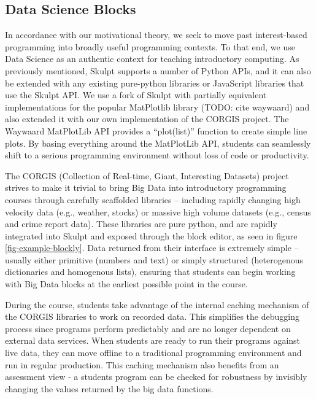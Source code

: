 \documentclass{sig-alternate}
\begin{document}
\subsection{Data Science Blocks}

In accordance with our motivational theory, we seek to move past interest-based programming into broadly useful programming contexts.
To that end, we use Data Science as an authentic context for teaching introductory computing.
As previously mentioned, Skulpt supports a number of Python APIs, and it can also be extended with any existing pure-python libraries or JavaScript libraries that use the Skulpt API.
We use a fork of Skulpt with partially equivalent implementations for the popular MatPlotlib library (TODO: cite waywaard) and also extended it with our own implementation of the CORGIS project.
The Waywaard MatPlotLib API provides a ``plot(list)'' function to create simple line plots.
By basing everything around the MatPlotLib API, students can seamlessly shift to a serious programming environment without loss of code or productivity. 

The CORGIS (Collection of Real-time, Giant, Interesting Datasets) project strives to make it trivial to bring Big Data into introductory programming courses through carefully scaffolded libraries -- including rapidly changing high velocity data (e.g., weather, stocks) or massive high volume datasets (e.g., census and crime report data).
These libraries are pure python, and are rapidly integrated into Skulpt and exposed through the block editor, as seen in figure \ref{fig-example-blockly}.
Data returned from their interface is extremely simple -- usually either primitive (numbers and text) or simply structured (heterogenous dictionaries and homogenous lists), ensuring that students can begin working with Big Data blocks at the earliest possible point in the course.

During the course, students take advantage of the internal caching mechanism of the CORGIS libraries to work on recorded data.
This simplifies the debugging process since programs perform predictably and are no longer dependent on external data services.
When students are ready to run their programs against live data, they can move offline to a traditional programming environment and run in regular production.
This caching mechanism also benefits from an assessment view - a students program can be checked for robustness by invisibly changing the values returned by the big data functions.
\end{document}
